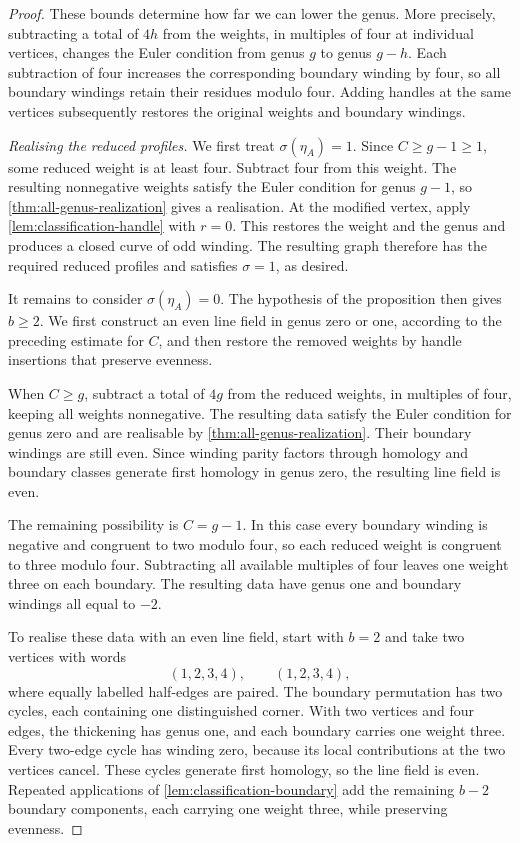 \documentclass[11pt]{amsart}
\theoremstyle{definition}
\theoremstyle{plain}
\theoremstyle{definition}
\theoremstyle{definition}
\begin{document}
\begin{proof}
These bounds determine how far we can lower the genus.
More precisely, subtracting a total of $4h$ from the
weights, in multiples of four at individual vertices,
changes the Euler condition from genus $g$ to genus $g-h$.
Each subtraction of four increases the corresponding
boundary winding by four, so all boundary windings
retain their residues modulo four.
Adding handles at the same vertices subsequently restores
the original weights and boundary windings.

\smallskip
\noindent\emph{Realising the reduced profiles.}
We first treat $\sigma(\eta_A)=1$.
Since $C\geq g-1\geq1$, some reduced weight is at least four.
Subtract four from this weight.
The resulting nonnegative weights satisfy the Euler
condition for genus $g-1$, so
\cref{thm:all-genus-realization} gives a realisation.
At the modified vertex, apply
\cref{lem:classification-handle} with $r=0$.
This restores the weight and the genus and produces a
closed curve of odd winding.
The resulting graph therefore has the required reduced
profiles and satisfies $\sigma=1$, as desired.

It remains to consider $\sigma(\eta_A)=0$.
The hypothesis of the proposition then gives $b\geq2$.
We first construct an even line field in genus zero or
one, according to the preceding estimate for $C$, and
then restore the removed weights by handle insertions
that preserve evenness.

When $C\geq g$, subtract a total of $4g$ from the reduced
weights, in multiples of four, keeping all weights
nonnegative.
The resulting data satisfy the Euler condition for
genus zero and are realisable by
\cref{thm:all-genus-realization}.
Their boundary windings are still even.
Since winding parity factors through homology and
boundary classes generate first homology in genus zero,
the resulting line field is even.

The remaining possibility is $C=g-1$.
In this case every boundary winding is negative and
congruent to two modulo four, so each reduced weight
is congruent to three modulo four.
Subtracting all available multiples of four leaves
one weight three on each boundary.
The resulting data have genus one and boundary
windings all equal to $-2$.

To realise these data with an even line field, start
with $b=2$ and take two vertices with words
\[
 (1,2,3,4),\qquad(1,2,3,4),
\]
where equally labelled half-edges are paired.
The boundary permutation has two cycles, each containing
one distinguished corner.
With two vertices and four edges, the thickening has
genus one, and each boundary carries one weight three.
Every two-edge cycle has winding zero, because its
local contributions at the two vertices cancel.
These cycles generate first homology, so the line
field is even.
Repeated applications of
\cref{lem:classification-boundary} add the remaining
$b-2$ boundary components, each carrying one weight
three, while preserving evenness.


\end{proof}
\end{document}
